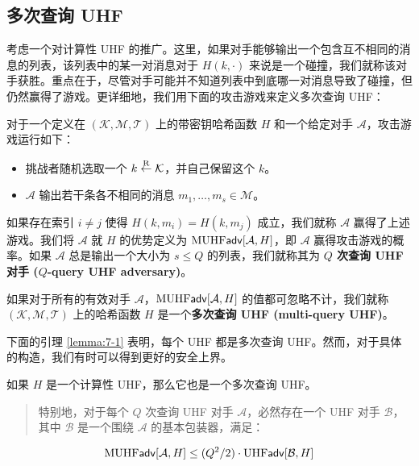 \subsection{多次查询 UHF}

考虑一个对计算性 UHF 的推广。这里，如果对手能够输出一个包含互不相同的消息的列表，该列表中的某一对消息对于 $H(k,\cdot)$ 来说是一个碰撞，我们就称该对手获胜。重点在于，尽管对手可能并不知道列表中到底哪一对消息导致了碰撞，但仍然赢得了游戏。更详细地，我们用下面的攻击游戏来定义多次查询 UHF：

\begin{game}\label{game:7-2}
对于一个定义在 $(\mathcal{K},\mathcal{M},\mathcal{T})$ 上的带密钥哈希函数 $H$ 和一个给定对手 $\mathcal{A}$，攻击游戏运行如下：
\begin{itemize}
	\item 挑战者随机选取一个 $k\overset{\rm R}\leftarrow\mathcal{K}$，并自己保留这个 $k$。
	\item $\mathcal{A}$ 输出若干条各不相同的消息 $m_1,\dots,m_s\in\mathcal{M}$。
\end{itemize}
如果存在索引 $i\neq j$ 使得 $H(k,m_i)=H(k,m_j)$ 成立，我们就称 $\mathcal{A}$ 赢得了上述游戏。我们将 $\mathcal{A}$ 就 $H$ 的优势定义为 ${\rm MUHF}\mathsf{adv}[\mathcal{A},H]$，即 $\mathcal{A}$ 赢得攻击游戏的概率。如果 $\mathcal{A}$ 总是输出一个大小为 $s\leq Q$ 的列表，我们就称其为 \textbf{$Q$ 次查询 UHF 对手 ($Q$-query UHF adversary)}。
\end{game}

\begin{definition}\label{def:7-3}
如果对于所有的有效对手 $\mathcal{A}$，${\rm MUHF}\mathsf{adv}[\mathcal{A},H]$ 的值都可忽略不计，我们就称 $(\mathcal{K},\mathcal{M},\mathcal{T})$ 上的哈希函数 $H$ 是一个\textbf{多次查询 UHF (multi-query UHF)}。
\end{definition}

下面的引理 \ref{lemma:7-1} 表明，每个 UHF 都是多次查询 UHF。然而，对于具体的构造，我们有时可以得到更好的安全上界。

\begin{lemma}\label{lemma:7-1}
如果 $H$ 是一个计算性 UHF，那么它也是一个多次查询 UHF。
\begin{quote}
特别地，对于每个 $Q$ 次查询 UHF 对手 $\mathcal{A}$，必然存在一个 UHF 对手 $\mathcal{B}$，其中 $\mathcal{B}$ 是一个围绕 $\mathcal{A}$ 的基本包装器，满足：
\end{quote}
\begin{equation}\label{eq:7-2}
{\rm MUHF}\mathsf{adv}[\mathcal{A},H]\leq{(Q^2/2)}\cdot{\rm UHF}\mathsf{adv}[\mathcal{B},H]
\end{equation}
\end{lemma}

